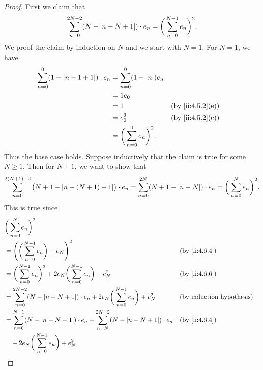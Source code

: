\begin{proof}
  First we claim that
  \[
    \sum_{n = 0}^{2N - 2} (N - \left\lvert n - N + 1\right\rvert) \cdot e_n = \bigg(\sum_{n = 0}^{N - 1} e_n\bigg)^2.
  \]
  We proof the claim by induction on \(N\) and we start with \(N = 1\).
  For \(N = 1\), we have
  \begin{align*}
    \sum_{n = 0}^0 (1 - \abs{n - 1 + 1}) \cdot e_n & = \sum_{n = 0}^0 (1 - \abs{n}) e_n                        \\
                                                   & = 1 e_0                                                   \\
                                                   & = 1                                 &  & \by{ii:4.5.2}[e] \\
                                                   & = e_0^2                             &  & \by{ii:4.5.2}[e] \\
                                                   & = \bigg(\sum_{n = 0}^0 e_n\bigg)^2.
  \end{align*}
  Thus the base case holds.
  Suppose inductively that the claim is true for some \(N \geq 1\).
  Then for \(N + 1\), we want to show that
  \[
    \sum_{n = 0}^{2(N + 1) - 2} \big(N + 1 - \abs{n - (N + 1) + 1}\big) \cdot e_n = \sum_{n = 0}^{2N} (N + 1 - \abs{n - N}) \cdot e_n = \bigg(\sum_{n = 0}^N e_n\bigg)^2.
  \]
  This is true since
  \begin{align*}
     & \bigg(\sum_{n = 0}^N e_n\bigg)^2                                                                                                                  \\
     & = \Bigg(\bigg(\sum_{n = 0}^{N - 1} e_n\bigg) + e_N\Bigg)^2                                                                     &  & \by{ii:4.6.4} \\
     & = \bigg(\sum_{n = 0}^{N - 1} e_n\bigg)^2 + 2 e_N \bigg(\sum_{n = 0}^{N - 1} e_n\bigg) + e_N^2                                  &  & \by{ii:4.6.6} \\
     & = \sum_{n = 0}^{2N - 2} (N - \abs{n - N + 1}) \cdot e_n + 2 e_N \bigg(\sum_{n = 0}^{N - 1} e_n\bigg) + e_N^2                   &  & \byIH         \\
     & = \sum_{n = 0}^{N - 1} (N - \abs{n - N + 1}) \cdot e_n + \sum_{n = N}^{2N - 2} (N - \abs{n - N + 1}) \cdot e_n                 &  & \by{ii:4.6.4} \\
     & \quad + 2 e_N \bigg(\sum_{n = 0}^{N - 1} e_n\bigg) + e_N^2                                                                                        \\

\end{align*}
\end{proof}

